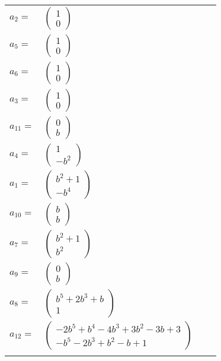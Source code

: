 \documentclass[1p]{elsarticle_modified}
\theoremstyle{definition}
\begin{document}
\begin{tabular}{m{7pt} m{180pt} m{7pt} m{180pt} }
\flushright $a_{2}=$&$\begin{pmatrix}1\\0\end{pmatrix}$ \\
\flushright $a_{5}=$&$\begin{pmatrix}1\\0\end{pmatrix}$ \\
\flushright $a_{6}=$&$\begin{pmatrix}1\\0\end{pmatrix}$ \\
\flushright $a_{3}=$&$\begin{pmatrix}1\\0\end{pmatrix}$ \\
\flushright $a_{11}=$&$\begin{pmatrix}0\\b\end{pmatrix}$ \\
\flushright $a_{4}=$&$\begin{pmatrix}1\\- b^2\end{pmatrix}$ \\
\flushright $a_{1}=$&$\begin{pmatrix}b^2+1\\- b^4\end{pmatrix}$ \\
\flushright $a_{10}=$&$\begin{pmatrix}b\\b\end{pmatrix}$ \\
\flushright $a_{7}=$&$\begin{pmatrix}b^2+1\\b^2\end{pmatrix}$ \\
\flushright $a_{9}=$&$\begin{pmatrix}0\\b\end{pmatrix}$ \\
\flushright $a_{8}=$&$\begin{pmatrix}b^5+2 b^3+b\\1\end{pmatrix}$ \\
\flushright $a_{12}=$&$\begin{pmatrix}-2 b^5+b^4-4 b^3+3 b^2-3 b+3\\- b^5-2 b^3+b^2- b+1\end{pmatrix}$\\&\end{tabular}
\end{document}
